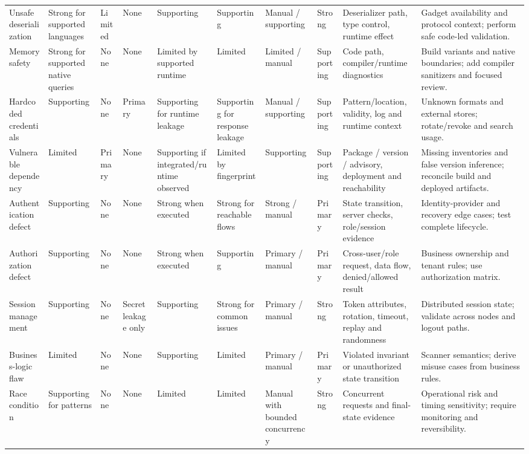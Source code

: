 \documentclass[11pt,letterpaper]{article}
\begin{document}
\begin{landscape}
\begin{longtable}{@{}L{1.1in}L{0.65in}L{0.70in}L{0.65in}L{0.65in}L{0.72in}L{0.64in}L{0.75in}L{1.35in}L{1.72in}@{}}
Unsafe deserialization & Strong for supported languages & Limited & None & Supporting & Supporting & Manual / supporting & Strong & Deserializer path, type control, runtime effect & Gadget availability and protocol context; perform safe code-led validation. \\
Memory safety & Strong for supported native queries & None & None & Limited by supported runtime & Limited & Limited / manual & Supporting & Code path, compiler/runtime diagnostics & Build variants and native boundaries; add compiler sanitizers and focused review. \\
Hardcoded credentials & Supporting & None & Primary & Supporting for runtime leakage & Supporting for response leakage & Manual / supporting & Supporting & Pattern/location, validity, log and runtime context & Unknown formats and external stores; rotate/revoke and search usage. \\
Vulnerable dependency & Limited & Primary & None & Supporting if integrated/runtime observed & Limited by fingerprint & Supporting & Supporting & Package / version / advisory, deployment and reachability & Missing inventories and false version inference; reconcile build and deployed artifacts. \\
Authentication defect & Supporting & None & None & Strong when executed & Strong for reachable flows & Strong / manual & Primary & State transition, server checks, role/session evidence & Identity-provider and recovery edge cases; test complete lifecycle. \\
Authorization defect & Supporting & None & None & Strong when executed & Supporting & Primary / manual & Primary & Cross-user/role request, data flow, denied/allowed result & Business ownership and tenant rules; use authorization matrix. \\
Session management & Supporting & None & Secret leakage only & Supporting & Strong for common issues & Primary / manual & Strong & Token attributes, rotation, timeout, replay and randomness & Distributed session state; validate across nodes and logout paths. \\
Business-logic flaw & Limited & None & None & Supporting & Limited & Primary / manual & Primary & Violated invariant or unauthorized state transition & Scanner semantics; derive misuse cases from business rules. \\
Race condition & Supporting for patterns & None & None & Limited & Limited & Manual with bounded concurrency & Strong & Concurrent requests and final-state evidence & Operational risk and timing sensitivity; require monitoring and reversibility. \\

\end{longtable}
\end{landscape}
\end{document}
